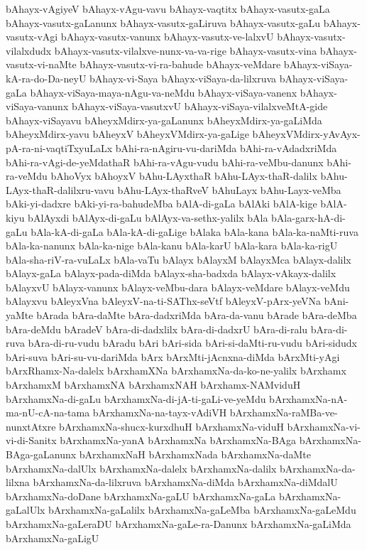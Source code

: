 {bAhayx-vAgiyeV
bAhayx-vAgu-vavu
bAhayx-vaqtitx
bAhayx-vasutx-gaLa
bAhayx-vasutx-gaLanunx
bAhayx-vasutx-gaLiruva
bAhayx-vasutx-gaLu
bAhayx-vasutx-vAgi
bAhayx-vasutx-vanunx
bAhayx-vasutx-ve-lalxvU
bAhayx-vasutx-vilalxdudx
bAhayx-vasutx-vilalxve-nunx-va-va-rige
bAhayx-vasutx-vina
bAhayx-vasutx-vi-naMte
bAhayx-vasutx-vi-ra-bahude
bAhayx-veMdare
bAhayx-viSaya-kA-ra-do-Da-neyU
bAhayx-vi-Saya
bAhayx-viSaya-da-lilxruva
bAhayx-viSaya-gaLa
bAhayx-viSaya-maya-nAgu-va-neMdu
bAhayx-viSaya-vanenx
bAhayx-viSaya-vanunx
bAhayx-viSaya-vasutxvU
bAhayx-viSaya-vilalxveMtA-gide
bAhayx-viSayavu
bAheyxMdirx-ya-gaLanunx
bAheyxMdirx-ya-gaLiMda
bAheyxMdirx-yavu
bAheyxV
bAheyxVMdirx-ya-gaLige
bAheyxVMdirx-yAvAyx-pA-ra-ni-vaqtiTxyuLaLx
bAhi-ra-nAgiru-vu-dariMda
bAhi-ra-vAdadxriMda
bAhi-ra-vAgi-de-yeMdathaR
bAhi-ra-vAgu-vudu
bAhi-ra-veMbu-danunx
bAhi-ra-veMdu
bAhoVyx
bAhoyxV
bAhu-LAyxthaR
bAhu-LAyx-thaR-dalilx
bAhu-LAyx-thaR-dalilxru-vavu
bAhu-LAyx-thaRveV
bAhuLayx
bAhu-Layx-veMba
bAki-yi-dadxre
bAki-yi-ra-bahudeMba
bAlA-di-gaLa
bAlAki
bAlA-kige
bAlA-kiyu
bAlAyxdi
bAlAyx-di-gaLu
bAlAyx-va-sethx-yalilx
bAla
bAla-garx-hA-di-gaLu
bAla-kA-di-gaLa
bAla-kA-di-gaLige
bAlaka
bAla-kana
bAla-ka-naMti-ruva
bAla-ka-nanunx
bAla-ka-nige
bAla-kanu
bAla-karU
bAla-kara
bAla-ka-rigU
bAla-sha-riV-ra-vuLaLx
bAla-vaTu
bAlayx
bAlayxM
bAlayxMca
bAlayx-dalilx
bAlayx-gaLa
bAlayx-pada-diMda
bAlayx-sha-badxda
bAlayx-vAkayx-dalilx
bAlayxvU
bAlayx-vanunx
bAlayx-veMbu-dara
bAlayx-veMdare
bAlayx-veMdu
bAlayxvu
bAleyxVna
bAleyxV-na-ti-SAThx-seVtf
bAleyxV-pArx-yeVNa
bAni-yaMte
bArada
bAra-daMte
bAra-dadxriMda
bAra-da-vanu
bArade
bAra-deMba
bAra-deMdu
bAradeV
bAra-di-dadxlilx
bAra-di-dadxrU
bAra-di-ralu
bAra-di-ruva
bAra-di-ru-vudu
bAradu
bAri
bAri-sida
bAri-si-daMti-ru-vudu
bAri-sidudx
bAri-suva
bAri-su-vu-dariMda
bArx
bArxMti-jAcnxna-diMda
bArxMti-yAgi
bArxRhamx-Na-dalelx
bArxhamXNa
bArxhamxNa-da-ko-ne-yalilx
bArxhamx
bArxhamxM
bArxhamxNA
bArxhamxNAH
bArxhamx-NAMviduH
bArxhamxNa-di-gaLu
bArxhamxNa-di-jA-ti-gaLi-ve-yeMdu
bArxhamxNa-nA-ma-nU-cA-na-tama
bArxhamxNa-na-tayx-vAdiVH
bArxhamxNa-raMBa-ve-nunxtAtxre
bArxhamxNa-shucx-kurxdhuH
bArxhamxNa-viduH
bArxhamxNa-vi-vi-di-Sanitx
bArxhamxNa-yanA
bArxhamxNa
bArxhamxNa-BAga
bArxhamxNa-BAga-gaLanunx
bArxhamxNaH
bArxhamxNada
bArxhamxNa-daMte
bArxhamxNa-dalUlx
bArxhamxNa-dalelx
bArxhamxNa-dalilx
bArxhamxNa-da-lilxna
bArxhamxNa-da-lilxruva
bArxhamxNa-diMda
bArxhamxNa-diMdalU
bArxhamxNa-doDane
bArxhamxNa-gaLU
bArxhamxNa-gaLa
bArxhamxNa-gaLalUlx
bArxhamxNa-gaLalilx
bArxhamxNa-gaLeMba
bArxhamxNa-gaLeMdu
bArxhamxNa-gaLeraDU
bArxhamxNa-gaLe-ra-Danunx
bArxhamxNa-gaLiMda
bArxhamxNa-gaLigU
}
